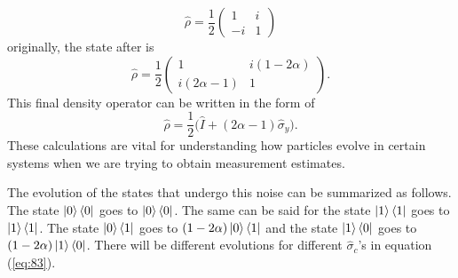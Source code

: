 \documentclass[twocolumn]{article}
\begin{document}
\begin{equation} \label{eq:87}
\hat{\rho}=\frac{1}{2}
\begin{pmatrix}
1 & i \\
-i & 1
\end{pmatrix}
\end{equation}
originally, the state after is
\begin{equation} \label{eq:88}
\hat{\rho}=\frac{1}{2}
\begin{pmatrix}
1 & i(1-2\alpha) \\
i(2\alpha-1) & 1
\end{pmatrix}.
\end{equation}
This final density operator can be written in the form of 
\begin{equation} \label{eq:89}
\hat{\rho}=\frac{1}{2}\big(\hat{I}+(2\alpha-1)\hat{\sigma}_y\big).
\end{equation}
These calculations are vital for understanding how particles evolve in certain systems when we are trying to obtain measurement estimates. 

The evolution of the states that undergo this noise can be summarized as follows. The state $\ket{0}\bra{0}$ goes to $\ket{0}\bra{0}$. The same can be said for the state $\ket{1}\bra{1}$ goes to $\ket{1}\bra{1}$. The state $\ket{0}\bra{1}$ goes to $(1-2\alpha)\ket{0}\bra{1}$ and the state $\ket{1}\bra{0}$ goes to $(1-2\alpha)\ket{1}\bra{0}$. There will be different evolutions for different $\hat{\sigma}_c$'s in equation (\ref{eq:83}).
\end{document}
